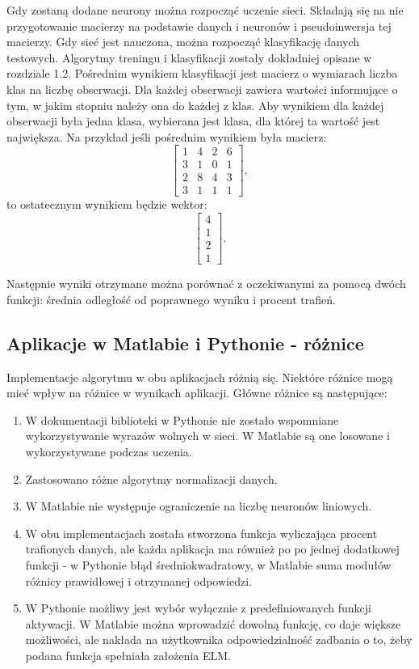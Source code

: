 \documentclass{article}
\begin{document}
Gdy zostaną dodane neurony można rozpocząć uczenie sieci. 
Składają się na nie przygotowanie macierzy na podstawie danych i neuronów i pseudoinwersja tej macierzy. 
Gdy sieć jest nauczona, można rozpocząć klasyfikację danych testowych.
Algorytmy treningu i klasyfikacji zostały dokładniej opisane w rozdziale 1.2.
Pośrednim wynikiem klasyfikacji jest macierz o wymiarach liczba klas na liczbę obserwacji.
Dla każdej obserwacji zawiera wartości informujące o tym, w jakim stopniu należy ona do każdej z klas.
Aby wynikiem dla każdej obserwacji była jedna klasa, wybierana jest klasa, dla której ta wartość jest największa.
Na przykład jeśli pośrednim wynikiem była macierz:
\[ \begin{bmatrix} 1&4&2&6 \\ 3&1&0&1 \\ 2&8&4&3 \\ 3&1&1&1 \end{bmatrix},\]
to ostatecznym wynikiem będzie wektor:
\[ \begin{bmatrix} 4 \\ 1 \\ 2 \\ 1 \end{bmatrix}.\]

Następnie wyniki otrzymane można porównać z oczekiwanymi za pomocą dwóch funkcji: średnia odległość od poprawnego wyniku i procent trafień.

\subsection{Aplikacje w Matlabie i Pythonie - różnice}
Implementacje algorytmu w obu aplikacjach różnią się. 
Niektóre różnice mogą mieć wpływ na różnice w wynikach aplikacji.
Główne różnice są następujące:
\begin{enumerate}
\item W dokumentacji biblioteki w Pythonie nie zostało wspomniane wykorzystywanie wyrazów wolnych w sieci.
W Matlabie są one losowane i wykorzystywane podczas uczenia.
\item Zastosowano różne algorytmy normalizacji danych.
\item W Matlabie nie występuje ograniczenie na liczbę neuronów liniowych.
\item W obu implementacjach została stworzona funkcja wyliczająca procent trafionych danych, ale każda aplikacja ma również po po jednej dodatkowej funkcji - w Pythonie błąd średniokwadratowy, w Matlabie suma modułów różnicy prawidłowej i otrzymanej odpowiedzi.
\item W Pythonie możliwy jest wybór wyłącznie z predefiniowanych funkcji aktywacji. 
W Matlabie można wprowadzić dowolną funkcję, co daje większe możliwości, ale nakłada na użytkownika odpowiedzialność zadbania o to, żeby podana funkcja spełniała założenia ELM.
\end{enumerate}
\end{document}
